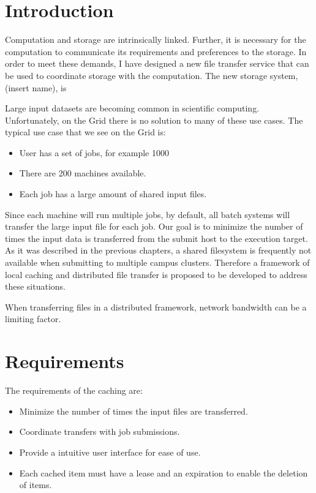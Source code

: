 \label{chapter:coordinatingstorage}


\section{Introduction}

Computation and storage are intrinsically linked.  Further, it is necessary for the computation to communicate its requirements and preferences to the storage.  In order to meet these demands, I have designed a new file transfer service that can be used to coordinate storage with the computation.  The new storage system, (insert name), is  

Large input datasets are becoming common in scientific computing.  Unfortunately, on the Grid there is no solution to many of these use cases.  The typical use case that we see on the Grid is:

\begin{itemize}

\item User has a set of jobs, for example 1000
\item There are 200 machines available.
\item Each job has a large amount of shared input files.

\end{itemize}

Since each machine will run multiple jobs, by default, all batch systems will transfer the large input file for each job.  Our goal is to minimize the number of times the input data is transferred from the submit host to the execution target.  As it was described in the previous chapters, a shared filesystem is frequently not available when submitting to multiple campus clusters.  Therefore a framework of local caching and distributed file transfer is proposed to be developed to address these situations.

When transferring files in a distributed framework, network bandwidth can be a limiting factor. 


\section{Requirements}

The requirements of the caching are:
\begin{itemize}
\item Minimize the number of times the input files are transferred.
\item Coordinate transfers with job submissions.
\item Provide a intuitive user interface for ease of use.
\item Each cached item must have a lease and an expiration to enable the deletion of items.
\end{itemize}

